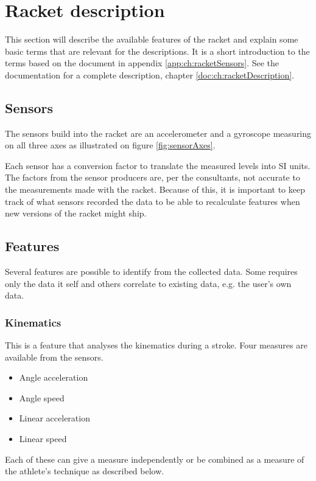 \section{Racket description}
This section will describe the available features of the racket and explain some basic terms that are relevant for the descriptions.
It is a short introduction to the terms based on the document in appendix \ref{app:ch:racketSensors}.
See the documentation for a complete description, chapter \ref{doc:ch:racketDescription}.

\subsection{Sensors}
The sensors build into the racket are an accelerometer and a gyroscope measuring on all three axes as illustrated on figure \ref{fig:sensorAxes}.

Each sensor has a conversion factor to translate the measured levels into SI units.
The factors from the sensor producers are, per the consultants, not accurate to the measurements made with the racket.
Because of this, it is important to keep track of what sensors recorded the data to be able to recalculate features when new versions of the racket might ship.


\subsection{Features}
Several features are possible to identify from the collected data.
Some requires only the data it self and others correlate to existing data, e.g. the user's own data.

\subsubsection*{Kinematics}
This is a feature that analyses the kinematics during a stroke.
Four measures are available from the sensors.

\begin{itemize}
    \item Angle acceleration
    \item Angle speed
    \item Linear acceleration
    \item Linear speed
\end{itemize}

Each of these can give a measure independently or be combined as a measure of the athlete's technique as described below.


